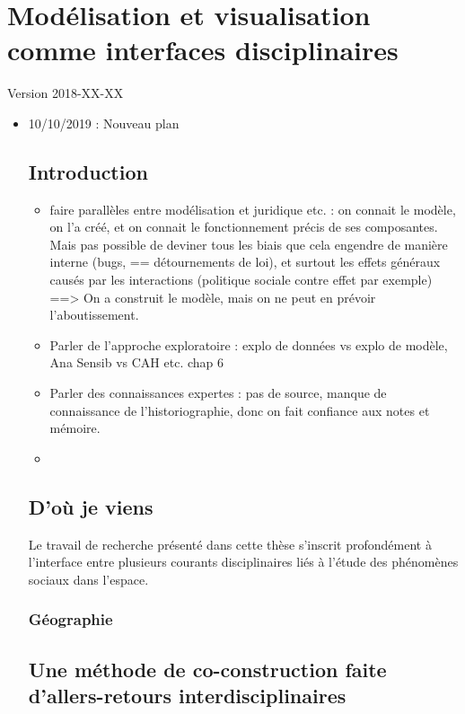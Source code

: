 \chapter{Modélisation et visualisation comme interfaces disciplinaires}
\label{chap:chap1}
\begin{center}
	{\large Version 2018-XX-XX}	\end{center}
\begin{itemize}
	\item 10/10/2019 : Nouveau plan
\minitoc

\clearpage
\section*{Introduction}

\begin{itemize}
	\item faire parallèles entre modélisation et juridique etc. : on connait le modèle, on l'a créé, et on connait le fonctionnement précis de ses composantes. Mais pas possible de deviner tous les biais que cela engendre de manière interne (bugs, == détournements de loi), et surtout les effets généraux causés par les interactions (politique sociale contre effet par exemple) ==> On a construit le modèle, mais on ne peut en prévoir l'aboutissement.
	\item Parler de l'approche exploratoire : explo de données vs explo de modèle, Ana Sensib vs CAH etc. chap  6
	\item Parler des connaissances expertes : pas de source, manque de connaissance de l'historiographie, donc on fait confiance aux notes et mémoire.
	\item 
\end{itemize}


\section{D'où je viens}

Le travail de recherche présenté dans cette thèse s'inscrit profondément à l'interface entre plusieurs courants disciplinaires liés à l'étude des phénomènes sociaux dans l'espace.
\subsection{Géographie}

\section{Une méthode de co-construction faite d'allers-retours interdisciplinaires}

\end{itemize}
